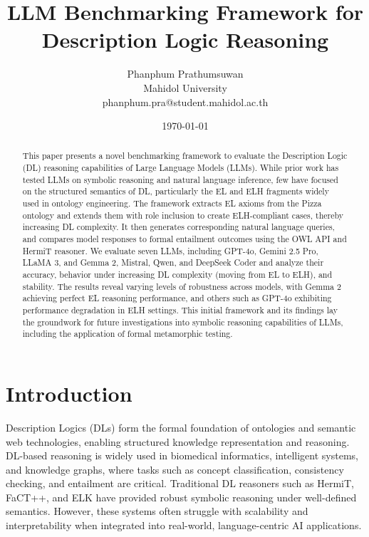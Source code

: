 \documentclass[11pt]{article}
\title{LLM Benchmarking Framework for Description Logic Reasoning}
\author{Phanphum Prathumsuwan\\Mahidol University\\phanphum.pra@student.mahidol.ac.th}
\date{\today}
\begin{document}
\maketitle

\begin{abstract}
This paper presents a novel benchmarking framework to evaluate the Description Logic (DL) reasoning capabilities of Large Language Models (LLMs). 
While prior work has tested LLMs on symbolic reasoning and natural language inference\cite{leapofthought2020,han2022folio}, few have focused on the structured semantics of DL, particularly the EL and ELH fragments widely used in ontology engineering\cite{baader2005el}. 
The framework extracts EL axioms from the Pizza ontology\cite{stanford2025pizza, horridge2004pizza} and extends them with role inclusion to create ELH-compliant cases, thereby increasing DL complexity. It then generates corresponding natural language queries, and compares model responses to formal entailment outcomes using the OWL API\cite{owlapi} and HermiT reasoner\cite{hermit2007, glimm2014hermit}. 
We evaluate seven LLMs, including GPT-4o\cite{gpt4o}, Gemini 2.5 Pro\cite{gemini}, LLaMA 3\cite{llama3}, and Gemma 2\cite{gemma3}, Mistral\cite{mistral}, Qwen\cite{qwen7b}, and DeepSeek Coder\cite{deepseekcoder} and analyze their accuracy, behavior under increasing DL complexity (moving from EL to ELH), and stability. The results reveal varying levels of robustness across models, with Gemma 2 achieving perfect EL reasoning performance, 
and others such as GPT-4o exhibiting performance degradation in ELH settings. 
This initial framework and its findings lay the groundwork for future investigations into symbolic reasoning capabilities of LLMs, including the application of formal metamorphic testing\cite{chen2018metamorphic}.
\end{abstract}

\section{Introduction}
Description Logics (DLs) form the formal foundation of ontologies and semantic web technologies, enabling structured knowledge representation and reasoning\cite{baader2007description}. 
DL-based reasoning is widely used in biomedical informatics\cite{bodenreider2004biomedical}, intelligent systems, and knowledge graphs\cite{ji2022knowledge}, where tasks such as concept classification, consistency checking, and entailment are critical. 
Traditional DL reasoners such as HermiT\cite{glimm2014hermit}, FaCT++\cite{tsarkov2006fact}, and ELK\cite{kazakov2014elk} have provided robust symbolic reasoning under well-defined semantics. 
However, these systems often struggle with scalability and interpretability when integrated into real-world, language-centric AI applications.
\end{document}
